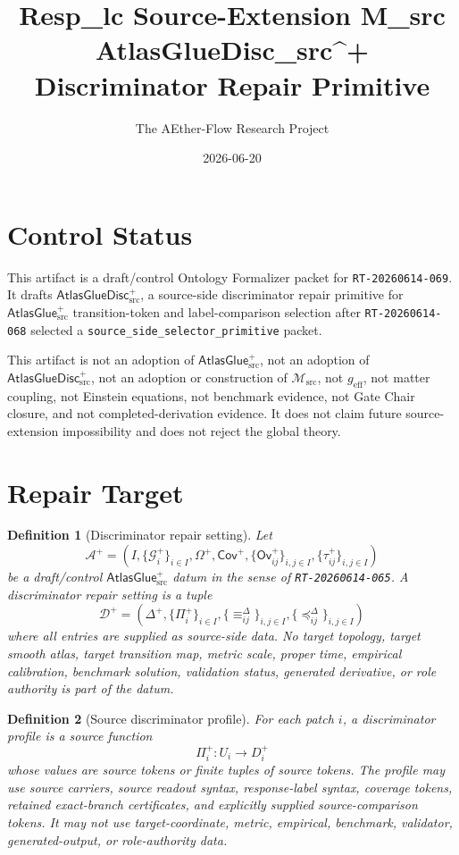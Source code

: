 \documentclass[11pt]{article}
\title{Resp\_lc Source-Extension M\_src AtlasGlueDisc\_src\^{}+ Discriminator Repair Primitive}
\author{The AEther-Flow Research Project}
\date{2026-06-20}
\newcommand{\Msrc}{\mathcal{M}_{\mathrm{src}}}
\newcommand{\geff}{g_{\mathrm{eff}}}
\newcommand{\AtlasGlue}{\mathsf{AtlasGlue}_{\mathrm{src}}^{+}}
\newcommand{\AtlasGlueDisc}{\mathsf{AtlasGlueDisc}_{\mathrm{src}}^{+}}
\newcommand{\Cov}{\mathsf{Cov}^{+}}
\newcommand{\Ov}{\mathsf{Ov}^{+}}
\newcommand{\Germ}{\mathcal{G}^{+}}
\newcommand{\Disc}{\Delta^{+}}
\newcommand{\Prof}{\Pi^{+}}
\newtheorem{definition}{Definition}
\begin{document}
\maketitle

\section*{Control Status}

This artifact is a draft/control Ontology Formalizer packet for
\texttt{RT-20260614-069}. It drafts \(\AtlasGlueDisc\), a source-side
discriminator repair primitive for \(\AtlasGlue\) transition-token and
label-comparison selection after \texttt{RT-20260614-068} selected a
\texttt{source\_side\_selector\_primitive} packet.

This artifact is not an adoption of \(\AtlasGlue\), not an adoption of
\(\AtlasGlueDisc\), not an adoption or construction of \(\Msrc\), not
\(\geff\), not matter coupling, not Einstein equations, not benchmark
evidence, not Gate Chair closure, and not completed-derivation evidence. It
does not claim future source-extension impossibility and does not reject the
global theory.

\section{Repair Target}

\begin{definition}[Discriminator repair setting]
Let
\[
  \mathcal A^+ =
  (I,\{\Germ_i\}_{i\in I},\Omega^+,\Cov,\{\Ov_{ij}\}_{i,j\in I},
  \{\tau_{ij}^+\}_{i,j\in I})
\]
be a draft/control \(\AtlasGlue\) datum in the sense of
\texttt{RT-20260614-065}. A discriminator repair setting is a tuple
\[
  \mathcal D^+=(\Disc,\{\Prof_i\}_{i\in I},\{\equiv_{ij}^{\Delta}\}_{i,j\in I},
  \{\preceq_{ij}^{\Delta}\}_{i,j\in I})
\]
where all entries are supplied as source-side data. No target topology,
target smooth atlas, target transition map, metric scale, proper time,
empirical calibration, benchmark solution, validation status, generated
derivative, or role authority is part of the datum.
\end{definition}

\begin{definition}[Source discriminator profile]
For each patch \(i\), a discriminator profile is a source function
\[
  \Prof_i:U_i\to D_i^+
\]
whose values are source tokens or finite tuples of source tokens. The profile
may use source carriers, source readout syntax, response-label syntax,
coverage tokens, retained exact-branch certificates, and explicitly supplied
source-comparison tokens. It may not use target-coordinate, metric, empirical,
benchmark, validator, generated-output, or role-authority data.
\end{definition}
\end{document}

